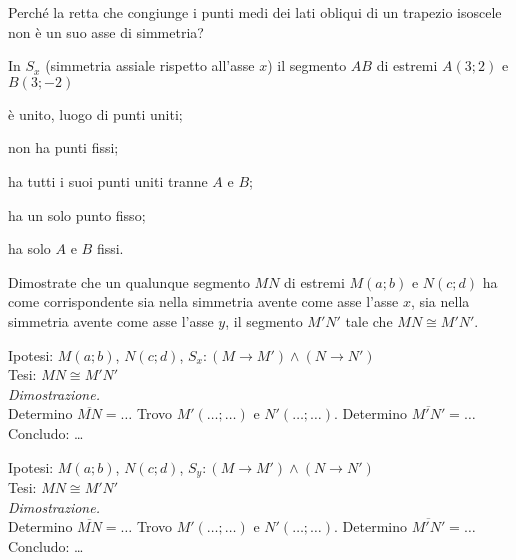 \begin{esercizio}
\label{ese:8.26}
Perché la retta che congiunge i punti medi dei lati obliqui di un 
trapezio isoscele non è un suo asse di simmetria?
\end{esercizio}

\begin{esercizio}
\label{ese:8.27}
In $S_x$ (simmetria assiale rispetto all'asse $x$) il segmento $AB$ 
di estremi $A(3;2)$ e $B(3;-2)$
\begin{enumeratea}
\item è unito, luogo di punti uniti;
\item non ha punti fissi;
\item ha tutti i suoi punti uniti tranne $A$ e $B$;
\item ha un solo punto fisso;
\item ha solo $A$ e $B$ fissi.
\end{enumeratea}
\end{esercizio}

\begin{esercizio}
\label{ese:8.28}
Dimostrate che un qualunque segmento $MN$ di estremi $M(a;b)$ e 
$N(c;d)$ ha come corrispondente sia nella simmetria avente come asse 
l'asse $x$, sia nella simmetria avente come asse l'asse $y$, il 
segmento $M'N'$ tale che $MN\cong M'N'$.\vspace{5pt}

\noindent Ipotesi: $M(a;b)$, $N(c;d)$, $S_x:(M\rightarrow M') \wedge 
(N\rightarrow N')$\\
Tesi: $MN\cong M'N'$\vspace{3pt}\\
\emph{Dimostrazione.}\\
Determino $\overline{MN}=\ldots{}$ Trovo $M'(\ldots{};\ldots{})$ e 
$N'(\ldots{};\ldots{})$. Determino $\overline{M'N'}=\ldots{}$\\
Concludo: \ldots{}\vspace{5pt}

\noindent Ipotesi: $M(a;b)$, $N(c;d)$, $S_y:(M\rightarrow M') \wedge 
(N\rightarrow N')$\\
Tesi: $MN\cong M'N'$\vspace{3pt}\\
\emph{Dimostrazione.}\\
Determino $\overline{MN}=\ldots{}$ Trovo $M'(\ldots{};\ldots{})$ e 
$N'(\ldots{};\ldots{})$. Determino $\overline{M'N'}=\ldots{}$\\
Concludo: \ldots{}
\end{esercizio}

